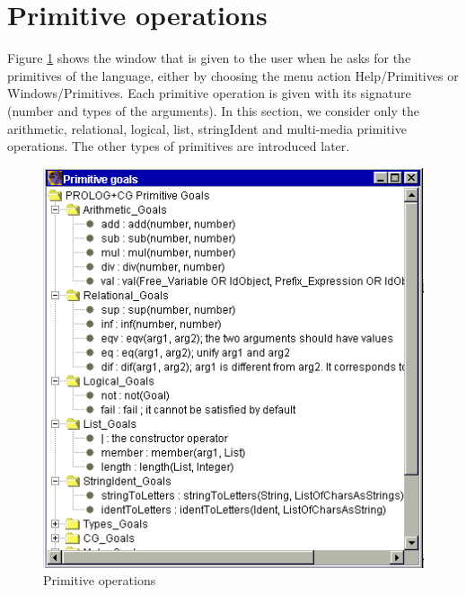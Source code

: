 \documentclass{book}
\begin{document}
\section{Primitive operations}\label{Sec:PrimitiveOps}

Figure \ref{EnvPrimHier2} shows the window that is given to the user
when he asks for the primitives of the language, either by choosing
the menu action Help/Primitives or Windows/Primitives.  Each primitive
operation is given with its signature (number and types of the
arguments). In this section, we consider only the arithmetic,
relational, logical, list, stringIdent and multi-media primitive
operations. The other types of primitives are introduced later.


\begin{latexonly}

\begin{figure}
\begin{center}
\includegraphics[scale=0.6]{EnvPrimHier2.png}
\end{center}
\caption{\label{EnvPrimHier2}Primitive operations}
\end{figure}

\end{latexonly}
\end{document}

